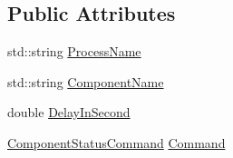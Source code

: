 \subsection*{Public Attributes}
\begin{DoxyCompactItemize}
\item 
std\-::string \hyperlink{classmts_component_status_control_af79c985b9f9820b1a8faabf58a0abf47}{Process\-Name}
\item 
std\-::string \hyperlink{classmts_component_status_control_a10e6f2dd9746957babad7a0ca081bf9c}{Component\-Name}
\item 
double \hyperlink{classmts_component_status_control_a91669bce299eebde1907da850c138c01}{Delay\-In\-Second}
\item 
\hyperlink{classmts_component_status_control_aaa1cc592d13ddd45a5cf695f72d3511f}{Component\-Status\-Command} \hyperlink{classmts_component_status_control_a689d4823e12fbae1ca81e3de0b246c40}{Command}
\end{DoxyCompactItemize}


